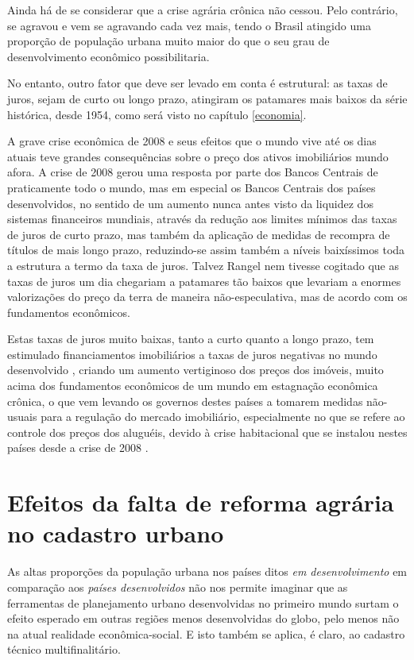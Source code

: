 \documentclass[
	12pt,				%
	oneside,			%
	a4paper,			%
	chapter=TITLE,		%
	section=TITLE,		%
	english,			%
	brazil				%
	]{abntex2}
\begin{document}
Ainda há de se considerar que a crise agrária crônica não cessou. Pelo
contrário, se agravou e vem se agravando cada vez mais, tendo o Brasil
atingido uma proporção de população urbana muito maior do que o seu grau
de desenvolvimento econômico possibilitaria.

No entanto, outro fator que deve ser levado em conta é estrutural: as
taxas de juros, sejam de curto ou longo prazo, atingiram os patamares
mais baixos da série histórica, desde 1954, como será visto no capítulo
\ref{economia}.

A grave crise econômica de 2008 e seus efeitos que o mundo vive até os
dias atuais teve grandes consequências sobre o preço dos ativos
imobiliários mundo afora. A crise de 2008 gerou uma resposta por parte
dos Bancos Centrais de praticamente todo o mundo, mas em especial os
Bancos Centrais dos países desenvolvidos, no sentido de um aumento nunca
antes visto da liquidez dos sistemas financeiros mundiais, através da
redução aos limites mínimos das taxas de juros de curto prazo, mas
também da aplicação de medidas de recompra de títulos de mais longo
prazo, reduzindo-se assim também a níveis baixíssimos toda a estrutura a
termo da taxa de juros. Talvez Rangel nem tivesse cogitado que as taxas
de juros um dia chegariam a patamares tão baixos que levariam a enormes
valorizações do preço da terra de maneira não-especulativa, mas de
acordo com os fundamentos econômicos.

Estas taxas de juros muito baixas, tanto a curto quanto a longo prazo,
tem estimulado financiamentos imobiliários a taxas de juros negativas no
mundo desenvolvido \autocite{serapicos}, criando um aumento vertiginoso
dos preços dos imóveis, muito acima dos fundamentos econômicos de um
mundo em estagnação econômica crônica, o que vem levando os governos
destes países a tomarem medidas não-usuais para a regulação do mercado
imobiliário, especialmente no que se refere ao controle dos preços dos
aluguéis, devido à crise habitacional que se instalou nestes países
desde a crise de 2008
\autocites{berlim}{londres}{california}{suecia}{newzeland}.

\section{Efeitos da falta de reforma agrária no cadastro
urbano}\label{efeitos-da-falta-de-reforma-agruxe1ria-no-cadastro-urbano}

As altas proporções da população urbana nos países ditos \emph{em
desenvolvimento} em comparação aos \emph{países desenvolvidos} não nos
permite imaginar que as ferramentas de planejamento urbano desenvolvidas
no primeiro mundo surtam o efeito esperado em outras regiões menos
desenvolvidas do globo, pelo menos não na atual realidade
econômica-social. E isto também se aplica, é claro, ao cadastro técnico
multifinalitário.
\end{document}
